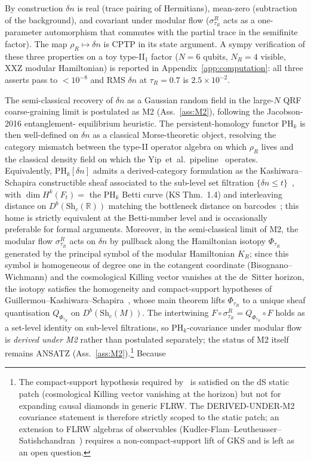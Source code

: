 \documentclass[aps,prd,superscriptaddress,nofootinbib,floatfix,10pt]{revtex4-2}
\theoremstyle{remark}
\newcommand{\tauR}{\tau_{R}}
\newcommand{\PHk}{\mathrm{PH}_{k}}
\newcommand{\dn}{\delta n}
\begin{document}
By construction $\dn$ is real (trace pairing of Hermitians), mean-zero
(subtraction of the background), and covariant under modular flow
($\sigma^{R}_{\tauR}$ acts as a one-parameter automorphism that
commutes with the partial trace in the semifinite factor). The map
$\rho_{R}\mapsto\dn$ is CPTP in its state argument. A sympy
verification of these three properties on a toy type-II$_{1}$ factor
($N=6$ qubits, $N_{R}=4$ visible, XXZ modular Hamiltonian) is reported
in Appendix~\ref{app:computation}: all three asserts pass
to $<10^{-8}$ and RMS $\dn$ at $\tauR=0.7$ is
$2.5\times 10^{-2}$.

The semi-classical recovery of $\dn$ as a Gaussian random field in the
large-$N$ QRF coarse-graining limit is postulated as M2
(Ass.~\ref{ass:M2}), following the Jacobson-2016 entanglement-
equilibrium heuristic. The persistent-homology functor $\PHk$ is then
well-defined on $\dn$ as a classical Morse-theoretic object, resolving
the category mismatch between the type-II operator algebra on which
$\rho_{R}$ lives and the classical density field on which the
Yip~et~al.\ pipeline~\cite{Yip2024} operates. Equivalently,
$\PHk[\dn]$ admits a derived-category formulation as the
Kashiwara--Schapira constructible sheaf associated to the sub-level
set filtration
$\{\dn \le t\}$~\cite{KashiwaraSchapira2018}, with
$\dim H^{k}(F_{t}) = $ the PH$_{k}$ Betti curve (KS Thm.~1.4) and
interleaving distance on $D^{b}(\mathrm{Sh}_{c}(\mathbb{R}))$ matching
the bottleneck distance on
barcodes~\cite{BerkoukGinot2018}; this home is strictly equivalent at
the Betti-number level and is occasionally preferable for formal
arguments. Moreover, in the semi-classical limit of M2, the modular
flow $\sigma^{R}_{\tauR}$ acts on $\dn$ by pullback along the
Hamiltonian isotopy $\Phi_{\tauR}$ generated by the principal symbol
of the modular Hamiltonian $K_{R}$; since this symbol is homogeneous
of degree one in the cotangent coordinate (Bisognano--Wichmann) and
the cosmological Killing vector vanishes at the de~Sitter horizon,
the isotopy satisfies the homogeneity and compact-support hypotheses
of Guillermou--Kashiwara--Schapira~\cite{GuillermouKashiwaraSchapira2012},
whose main theorem lifts $\Phi_{\tauR}$ to a unique sheaf quantisation
$Q_{\Phi_{\tauR}}$ on $D^{b}(\mathrm{Sh}_{c}(M))$. The intertwining
$F \circ \sigma^{R}_{\tauR} = Q_{\Phi_{\tauR}} \circ F$ holds as a
set-level identity on sub-level filtrations, so PH$_{k}$-covariance
under modular flow is \emph{derived under M2} rather than postulated
separately; the status of M2 itself remains ANSATZ
(Ass.~\ref{ass:M2}).\footnote{The compact-support hypothesis required
by~\cite{GuillermouKashiwaraSchapira2012} is satisfied on the dS
static patch (cosmological Killing vector vanishing at the horizon)
but not for expanding causal diamonds in generic FLRW. The
DERIVED-UNDER-M2 covariance statement is therefore strictly scoped
to the static patch; an extension to FLRW algebras of observables
(Kudler-Flam--Leutheusser--Satishchandran~\cite{KFLS2024})
requires a non-compact-support lift of GKS and is left as an open
question.} Because
\end{document}
